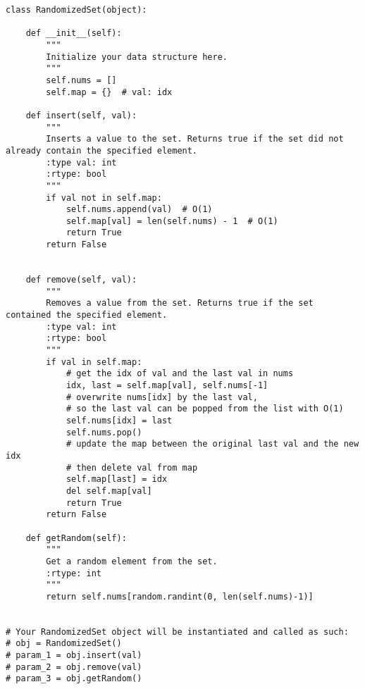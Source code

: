 \begin{lstlisting}
class RandomizedSet(object):

    def __init__(self):
        """
        Initialize your data structure here.
        """
        self.nums = []
        self.map = {}  # val: idx

    def insert(self, val):
        """
        Inserts a value to the set. Returns true if the set did not already contain the specified element.
        :type val: int
        :rtype: bool
        """
        if val not in self.map:
            self.nums.append(val)  # O(1)
            self.map[val] = len(self.nums) - 1  # O(1)
            return True
        return False
        

    def remove(self, val):
        """
        Removes a value from the set. Returns true if the set contained the specified element.
        :type val: int
        :rtype: bool
        """
        if val in self.map:
            # get the idx of val and the last val in nums
            idx, last = self.map[val], self.nums[-1]
            # overwrite nums[idx] by the last val, 
            # so the last val can be popped from the list with O(1) 
            self.nums[idx] = last
            self.nums.pop()
            # update the map between the original last val and the new idx
            # then delete val from map
            self.map[last] = idx
            del self.map[val]
            return True
        return False

    def getRandom(self):
        """
        Get a random element from the set.
        :rtype: int
        """
        return self.nums[random.randint(0, len(self.nums)-1)]


# Your RandomizedSet object will be instantiated and called as such:
# obj = RandomizedSet()
# param_1 = obj.insert(val)
# param_2 = obj.remove(val)
# param_3 = obj.getRandom()
\end{lstlisting}

